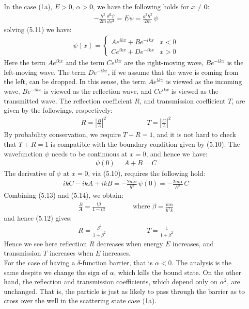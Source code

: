 \documentclass[11pt]{book}
\theoremstyle{break}
\theoremstyle{break}
\begin{document}
In the case (1a), $E>0$, $\alpha>0$, we have the following holds for $x \neq 0$:
\begin{align}
-\frac{\hbar^2}{2m}\frac{d^2 \psi}{d x^2} = E\psi = \frac{k^2 \hbar^2}{2m}\, \psi
\end{align}
solving (5.11) we have:
\begin{align*}
\psi(x) = \begin{cases}
A e^{ikx} + B e^{-ikx} & x<0\\
C e^{ikx} + D e^{-ikx} & x>0
\end{cases}
\end{align*}
Here the term $Ae^{ikx}$ and the term $Ce^{ikx}$ are the right-moving wave, $Be^{-ikx}$ is the left-moving wave. The term $De^{-ikx}$, if we assume that the wave is coming from the left, can be dropped. In this sense, the term $Ae^{ikx}$ is viewed as the incoming wave, $Be^{-ikx}$ is viewed as the reflection wave, and $Ce^{ikx}$ is viewed as the transmitted wave. The reflection coefficient $R$, and transmission coefficient $T$, are given by the followings, respectively:
\begin{align}
R = \left| \frac{B}{A}\right|^2 \qquad\qquad \qquad T = \left| \frac{C}{A}\right|^2
\end{align}
By probability conservation, we require $T+R = 1$, and it is not hard to check that $T+R = 1$ is compatible with the boundary condition given by (5.10). The wavefunction $\psi$ needs to be continuous at $x =0$, and hence we have:
\begin{align}
\psi(0) = A+B = C
\end{align}
The derivative of $\psi$ at $x = 0$, via (5.10), requires the following hold:
\begin{align}
ikC - ikA + ikB = -\frac{2m\alpha}{\hbar^2} \, \psi(0) = -\frac{2m\alpha}{\hbar^2}\, C
\end{align}
Combining (5.13) and (5.14), we obtain:
\begin{align*}
\frac{B}{A} = \frac{i\beta}{1 - i\beta} \qquad\qquad \text{where }\beta = \frac{m\alpha}{\hbar^2 k}
\end{align*}
and hence (5.12) gives:
\begin{align*}
R = \frac{\beta^2}{1+\beta^2 }\qquad\qquad\qquad T = \frac{1}{1+\beta^2}
\end{align*}
Hence we see here reflection $R$ decreases when energy $E$ increases, and transmission $T$ increases when $E$ increases. \\

For the case of having a $\delta$-function barrier, that is $\alpha<0$. The analysis is the same despite we change the sign of $\alpha$, which kills the bound state. On the other hand, the reflection and transmission coefficients, which depend only on $\alpha^2$, are
unchanged. That is, the particle is just as likely to pass through the barrier as to cross over the well in the scattering state case (1a).
\end{document}
